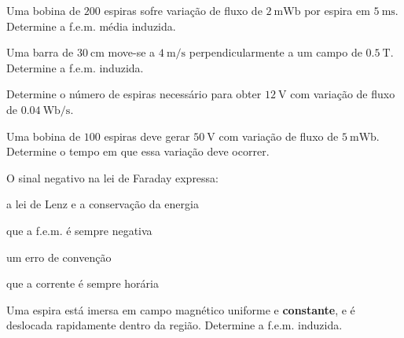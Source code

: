\blocofixacao
\begin{questao}[1]{}

Uma bobina de $200$ espiras sofre variação de fluxo de
$\SI{2}{\milli\weber}$ por espira em $\SI{5}{\milli\second}$. Determine a
f.e.m. média induzida.


\end{questao}
\begin{questao}[1]{}

Uma barra de $\SI{30}{\centi\meter}$ move-se a $\SI{4}{\meter\per\second}$
perpendicularmente a um campo de $\SI{0.5}{\tesla}$. Determine a f.e.m.
induzida.


\end{questao}
\begin{questao}[1]{}

Determine o número de espiras necessário para obter $\SI{12}{\volt}$ com
variação de fluxo de $\SI{0.04}{\weber\per\second}$.


\end{questao}
\begin{questao}[1]{}

Uma bobina de $100$ espiras deve gerar $\SI{50}{\volt}$ com variação de fluxo
de $\SI{5}{\milli\weber}$. Determine o tempo em que essa variação deve ocorrer.


\end{questao}
\begin{questao}[1]{}

O sinal negativo na lei de Faraday expressa:
\begin{alternativas}[2]
\item a lei de Lenz e a conservação da energia
\item que a f.e.m. é sempre negativa
\item um erro de convenção
\item que a corrente é sempre horária
\end{alternativas}


\end{questao}
\begin{questao}[1]{}

Uma espira está imersa em campo magnético uniforme e \textbf{constante}, e é
deslocada rapidamente dentro da região. Determine a f.e.m. induzida.


\end{questao}
